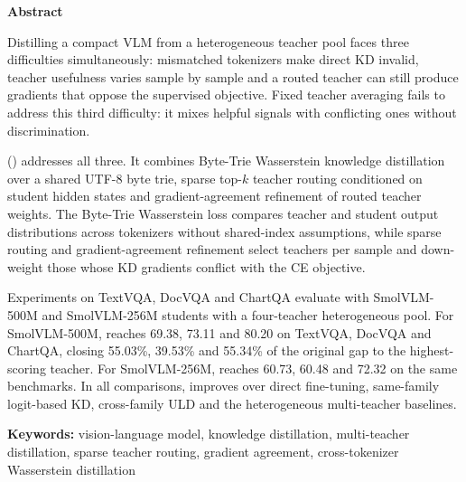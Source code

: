 \begin{center}
\textbf{\large{Abstract}}
\end{center}

\begin{small}

Distilling a compact VLM from a heterogeneous teacher pool faces three
difficulties simultaneously: mismatched tokenizers make direct KD invalid,
teacher usefulness varies sample by sample and a routed teacher can still
produce gradients that oppose the supervised objective. Fixed teacher averaging
fails to address this third difficulty: it mixes helpful signals with
conflicting ones without discrimination.

\gracefull{} (\gracename{}) addresses all three. It combines Byte-Trie
Wasserstein knowledge distillation over a shared UTF-8 byte trie, sparse top-$k$
teacher routing conditioned on student hidden states and gradient-agreement
refinement of routed teacher weights. The Byte-Trie Wasserstein loss compares
teacher and student output distributions across tokenizers without shared-index
assumptions, while sparse routing and gradient-agreement refinement select
teachers per sample and down-weight those whose KD gradients conflict with
the CE objective.

Experiments on TextVQA, DocVQA and ChartQA evaluate \methodname{} with
SmolVLM-500M and SmolVLM-256M students with a four-teacher heterogeneous pool.
For SmolVLM-500M, \methodname{} reaches 69.38, 73.11 and 80.20 on TextVQA,
DocVQA and ChartQA, closing 55.03\%, 39.53\% and 55.34\% of the original
gap to the highest-scoring teacher. For SmolVLM-256M, \methodname{} reaches
60.73, 60.48 and 72.32 on the same benchmarks. In all comparisons,
\methodname{} improves over direct fine-tuning, same-family logit-based KD,
cross-family ULD and the heterogeneous multi-teacher baselines.


\vspace*{1cm}
\textbf{Keywords:} vision-language model, knowledge distillation,
multi-teacher distillation, sparse teacher routing, gradient agreement,
cross-tokenizer Wasserstein distillation
\end{small}
